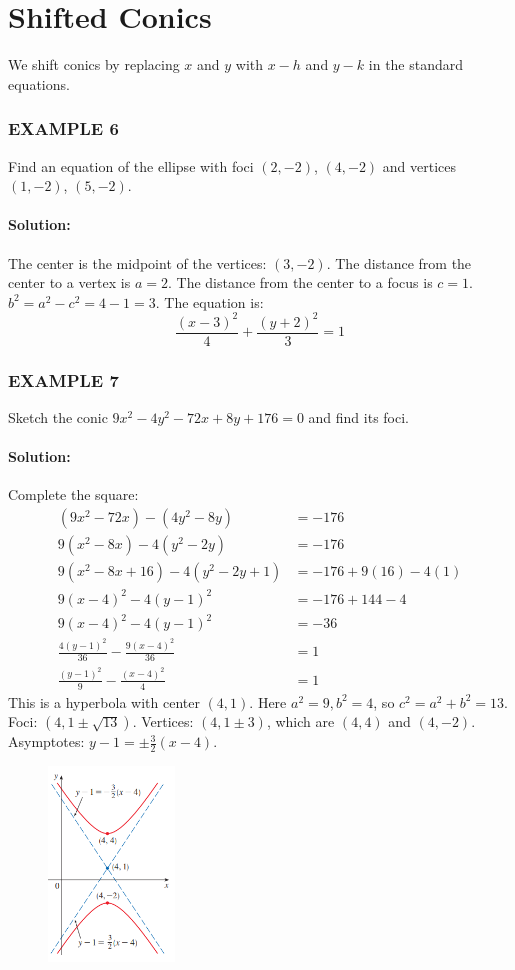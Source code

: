 \documentclass{article}
\begin{document}
\section*{Shifted Conics}
We shift conics by replacing $x$ and $y$ with $x-h$ and $y-k$ in the standard equations.

\subsubsection*{EXAMPLE 6}
Find an equation of the ellipse with foci $(2, -2)$, $(4, -2)$ and vertices $(1, -2)$, $(5, -2)$.

\paragraph{Solution:}
The center is the midpoint of the vertices: $(3, -2)$. The distance from the center to a vertex is $a = 2$. The distance from the center to a focus is $c = 1$.
$b^2 = a^2 - c^2 = 4 - 1 = 3$. The equation is:
\[
\frac{(x-3)^2}{4} + \frac{(y+2)^2}{3} = 1
\]

\subsubsection*{EXAMPLE 7}
Sketch the conic $9x^2 - 4y^2 - 72x + 8y + 176 = 0$ and find its foci.

\paragraph{Solution:}
Complete the square:
\begin{align*}
    (9x^2 - 72x) - (4y^2 - 8y) &= -176 \\
    9(x^2 - 8x) - 4(y^2 - 2y) &= -176 \\
    9(x^2 - 8x + 16) - 4(y^2 - 2y + 1) &= -176 + 9(16) - 4(1) \\
    9(x-4)^2 - 4(y-1)^2 &= -176 + 144 - 4 \\
    9(x-4)^2 - 4(y-1)^2 &= -36 \\
    \frac{4(y-1)^2}{36} - \frac{9(x-4)^2}{36} &= 1 \\
    \frac{(y-1)^2}{9} - \frac{(x-4)^2}{4} &= 1
\end{align*}
This is a hyperbola with center $(4,1)$. Here $a^2=9, b^2=4$, so $c^2 = a^2+b^2=13$.
Foci: $(4, 1 \pm \sqrt{13})$. Vertices: $(4, 1 \pm 3)$, which are $(4,4)$ and $(4,-2)$.
Asymptotes: $y-1 = \pm\frac{3}{2}(x-4)$.
\begin{figure}[htbp]
    \centering
    \includegraphics[width=0.3\textwidth]{graph59.png}
\end{figure}
\end{document}
